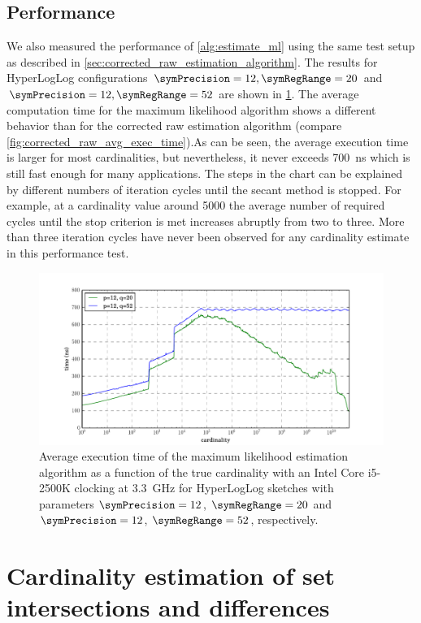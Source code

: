 \documentclass[a4paper]{scrartcl}
\begin{document}
\subsection{Performance}
We also measured the performance of \cref{alg:estimate_ml} using the same test setup as described in \cref{sec:corrected_raw_estimation_algorithm}. The results for HyperLogLog configurations $\symPrecision=12, \symRegRange=20$ and $\symPrecision=12, \symRegRange=52$ are shown in \cref{fig:avg_exec_time}. The average computation time for the maximum likelihood algorithm shows a different behavior than for the corrected raw estimation algorithm (compare \cref{fig:corrected_raw_avg_exec_time}).As can be seen, the average execution time is larger for most cardinalities, but nevertheless, it never exceeds \SI{700}{\nano\second} which is still fast enough for many applications. The steps in the chart can be explained by different numbers of iteration cycles until the secant method is stopped. For example, at a cardinality value around \num{5000} the average number of required cycles until the stop criterion is met increases abruptly from two to three. More than three iteration cycles have never been observed for any cardinality estimate in this performance test.

\begin{figure}
\centering
\includegraphics[width=1\textwidth]{max_likelihood_avg_exec_time}
\caption{Average execution time of the maximum likelihood estimation algorithm as a function of the true cardinality with an Intel Core i5-2500K clocking at \SI{3.3}{\giga\hertz} for HyperLogLog sketches with parameters $\symPrecision=12$, $\symRegRange=20$ and $\symPrecision=12$, $\symRegRange=52$, respectively.}
\label{fig:avg_exec_time}
\end{figure}

\section{Cardinality estimation of set intersections and differences}
\label{sec:cardinality_estimation_set_intersections}
\end{document}
